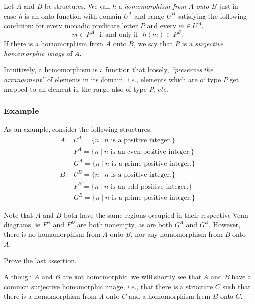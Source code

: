 Let $A$ and $B$ be structures. We call $h$ a {\em homomorphism from}
$A$ {\em onto} $B$ just in case $h$ is an onto function with domain $U^A$
and range $U^B$ satisfying the following condition:
for every monadic predicate letter $P$ and every $m \in U^A,$
\[ m \in P^A\ \ \ \mbox{if and only if}\ \ \ h(m) \in P^B.\]
If there is a homomorphism from $A$ onto $B$, we say that $B$ is a {\em
surjective homomorphic image} of $A.$

\begin{aside}
    Intuitively, a homomorphism is a function that loosely, \emph{``preserves the arrangement''} of elements in its domain, \textit{i.e.}, elements which are of type $P$ get mapped to an element in the range also of type $P$, \textit{etc.}
\end{aside}

\subsubsection*{Example}

As an example, consider the following structures.
\[
\begin{array}{ll}
A: & U^A=\{n\mid n\mbox{ is a positive integer.}\}\\ 
 & F^A=\{n\mid n\mbox{ is an even positive integer.}\}\\ 
 & G^A=\{n\mid n\mbox{ is a prime positive integer.}\}
\end{array}
\]
\[
\begin{array}{ll}
B: & U^B=\{n\mid n\mbox{ is a positive integer.}\}\\ 
 & F^B=\{n\mid n\mbox{ is an odd positive integer.}\}\\ 
 & G^B=\{n\mid n\mbox{ is a prime positive integer.}\}
\end{array}
\]

Note that $A$ and $B$ both have the same regions occupied in their respective Venn diagrams, ie $F^A$ and $F^B$ are both nonempty, as are both $G^A$ and $G^B$. However, there is no homomorphism from $A$ onto $B$, nor any homomorphism from $B$ onto $A$. 

\begin{aside}
    Prove the last assertion. 
\end{aside}

Although $A$ and $B$ are not homomorphic, we will shortly see that $A$ and $B$ have a common surjective homomorphic image, \textit{i.e.}, that there is a structure $C$ such that there is a homomorphism from $A$ onto $C$ and a homomorphism from $B$ onto $C$.





